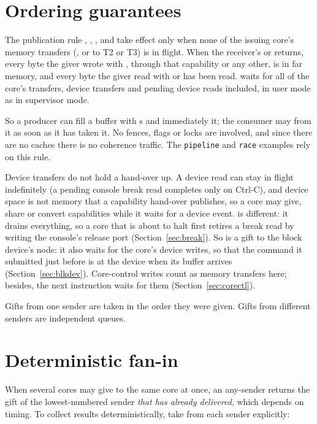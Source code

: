 \section{Ordering guarantees}\label{sec:publication}

\begin{rule*}{The publication rule}
, , ,  and  take effect only when none of
the issuing core's memory transfers (,  or  to T2 or T3) is in
flight. When the receiver's  or  returns, every byte the giver wrote with
, through that capability or any other, is in far memory, and every byte the giver read with
 or  has been read.  waits for all of the core's transfers, device
transfers and pending device reads included, in user mode as in supervisor mode.
\end{rule*}

So a producer can fill a buffer with s and immediately  it; the consumer may
 from it as soon as it has taken it. No fences, flags or locks are involved, and since there
are no caches there is no coherence traffic. The \texttt{pipeline} and \texttt{race} examples rely on
this rule.

Device transfers do not hold a hand-over up. A device read can stay in flight indefinitely (a
pending console break read completes only on Ctrl-C), and device space is not memory that a
capability hand-over publishes, so a core may give, share or convert capabilities while it waits for a
device event.  is different: it drains everything, so a core that is about to halt first
retires a break read by writing the console's release port (Section~\ref{sec:break}). So is a gift to
the block device's node: it also waits for the core's device writes, so that the command it submitted
just before is at the device when its buffer arrives (Section~\ref{sec:blkdev}). Core-control writes
count as memory transfers here; besides, the next instruction waits for them (Section~\ref{sec:corectl}).

Gifts from one sender are taken in the order they were given. Gifts from different senders are
independent queues.

\section{Deterministic fan-in}

When several cores may give to the same core at once, an any-sender  returns the gift of
the lowest-numbered sender \emph{that has already delivered}, which depends on timing. To collect
results deterministically, take from each sender explicitly:

